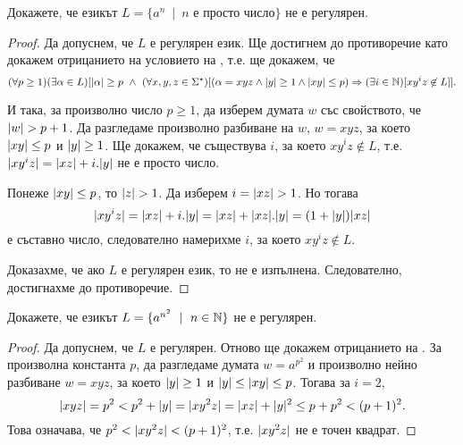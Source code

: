 \begin{problem}
  Докажете, че езикът $L = \{a^n\ \mid\ n\mbox{ е просто число}\}$ не е регулярен.
\end{problem}
\begin{proof}
  Да допуснем, че $L$ е регулярен език. Ще достигнем до противоречие като докажем отрицанието на условието на ,
  т.е. ще докажем, че
  {\scriptsize
    \[(\forall p \geq 1)(\exists \alpha \in L)[\vert{\alpha}\vert \geq p\ \wedge\ (\forall x,y,z\in\Sigma^\star)[(\alpha = xyz \wedge \vert{y}\vert \geq 1\wedge \vert{xy}\vert \leq p) \Rightarrow (\exists i\in\mathbb{N})[xy^iz \not\in L]].\]}

  И така, за произволно число $p \geq 1$, да изберем думата $w$ със свойството, че $\vert{w}\vert > p+1$.
  Да разгледаме произволно разбиване на $w$, $w = xyz$, за което $\vert{xy}\vert \leq p$ и $\vert{y}\vert \geq 1$.
  Ще докажем, че съществува $i$, за което $xy^iz \not\in L$, т.е. $\vert{xy^iz}\vert = \vert{xz}\vert + i.\vert{y}\vert$ не е просто число.
  
  Понеже $\vert{xy}\vert \leq p$, то $\vert{z}\vert > 1 $.
  Да изберем $i = \vert{xz}\vert > 1$.
  Но тогава \[\vert{xy^iz}\vert = \vert{xz}\vert + i.\vert{y}\vert = \vert{xz}\vert + \vert{xz}\vert.\vert{y}\vert = (1 + \vert{y}\vert)\vert{xz}\vert\] е съставно число, следователно 
  намерихме $i$, за което $xy^iz \not\in L$.

  Доказахме, че ако $L$ е регулярен език, то  не е изпълнена. Следователно, достигнахме до противоречие.
\end{proof}

\begin{problem}
  Докажете, че езикът $L = \{a^{n^2}\ \mid\ n\in\Nat\}$ не е регулярен.  
\end{problem}
\begin{proof}
  Да допуснем, че $L$ е регулярен. Отново ще докажем отрицанието на .
  За произволна константа $p$, да разгледаме думата $w = a^{p^2}$ и произволно нейно разбиване
  $w = xyz$, за което $\vert{y}\vert \geq 1$ и $\vert{y}\vert \leq \vert{xy}\vert \leq p$.
  Тогава за $i = 2$,
  \[\vert{xyz}\vert = p^2 < p^2 + \vert{y}\vert = \vert{xy^2z}\vert = \vert{xz}\vert + \vert{y}\vert^2 \leq p + p^2 < (p+1)^2.\]
  Това означава, че $p^2 < \vert{xy^2z}\vert < (p+1)^2$, т.е. $\vert{xy^2z}\vert$ не е точен квадрат.
\end{proof}

